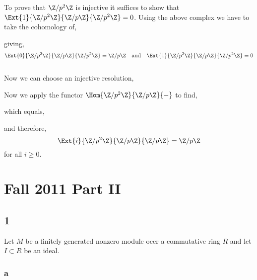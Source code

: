\documentclass[12pt]{article}
\begin{document}
To prove that $\Z / p^2 \Z$ is injective it suffices to show that $\Ext{1}{\Z / p^2 \Z}{\Z / p \Z}{\Z / p^2 \Z} = 0$. Using the above complex we have to take the cohomology of,
\begin{center}
\end{center}
giving,
\[ \Ext{0}{\Z / p^2 \Z}{\Z / p \Z}{\Z / p^2 \Z} = \Z / p \Z \quad \text{and} \quad \Ext{1}{\Z / p^2 \Z}{\Z / p \Z}{\Z / p^2 \Z} = 0 \]
\bigskip\\
Now we can choose an injective resolution,
\begin{center}
\end{center}
Now we apply the functor $\Hom{\Z/p^2 \Z}{\Z / p \Z}{-}$ to find,
\begin{center}
\end{center}
which equals,
\begin{center}
\end{center}
and therefore,
\[ \Ext{i}{\Z / p^2 \Z}{\Z / p \Z}{\Z / p \Z} = \Z / p \Z \]
for all $i \ge 0$.

\section{Fall 2011 Part II}

\subsection{1}

Let $M$ be a finitely generated nonzero module ocer a commutative ring $R$ and let $I \subset R$ be an ideal.

\subsubsection{a}
\end{document}
